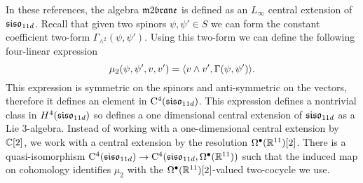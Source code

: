 In these references, the algebra $\m2$ is defined as an $L_\infty$  
central extension of $\mathfrak{siso}_{11d}$. 
Recall that given two spinors $\psi, \psi' \in S$ we can form the constant coefficient two-form $\Gamma_{\wedge^2} (\psi, \psi')$. 
Using this two-form we can define the following four-linear expression
\[
\mu_2 (\psi, \psi',v,v') = \langle v \wedge v', \Gamma(\psi, \psi')\rangle .
\]
This expression is symmetric on the spinors and anti-symmetric on the vectors, therefore it defines an element in ${\rm C}^4(\mathfrak{siso}_{11d})$. 
This expression defines a nontrivial class in $H^4(\mathfrak{siso}_{11d})$ so defines a one dimensional central extension of $\mathfrak{siso}_{11d}$ as a Lie 3-algebra. 
Instead of working with a one-dimensional central extension by $\mathbb C[2]$, we work with a central extension by the resolution $\Omega^\bullet(\mathbb R^{11})[2]$. There is a quasi-isomorphism ${\rm C}^4(\mathfrak{siso}_{11d})\to {\rm C}^4(\mathfrak{siso}_{11d}, \Omega^\bullet (\mathbb{R}^{11}))$ such that the induced map on cohomology identifies $\mu_2$ with the $\Omega^\bullet(\mathbb R^{11})[2]$-valued two-cocycle we use. 


